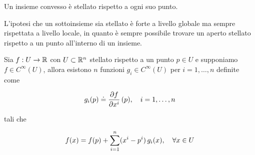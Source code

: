 \begin{remark}
	Un insieme convesso è stellato rispetto a ogni suo punto.
\end{remark}

L'ipotesi che un sottoinsieme sia stellato è forte a livello globale ma sempre rispettata a livello locale, in quanto è sempre possibile trovare un aperto stellato rispetto a un punto all'interno di un insieme.

\begin{theorem}
	Sia $ f : U \to \mathbb{R} $ con $ U \subset \mathbb{R}^{n} $ stellato rispetto a un punto $ p \in U $ e supponiamo $ f \in C^{\infty}(U) $, allora esistono $ n $ funzioni $ g_{i} \in C^{\infty}(U) $ per $ i = 1,\dots,n $ definite come
	
	\begin{equation}
		g_{i}(p) \doteq \pdv{f}{x^{i}} \, (p) \qcomma i=1,\dots,n
	\end{equation}

	tali che
	
	\begin{equation}
		f(x) = f(p) + \sum_{i=1}^{n} (x^{i}-p^{i}) \, g_{i}(x) \qcomma \forall x \in U
	\end{equation}	
\end{theorem}

